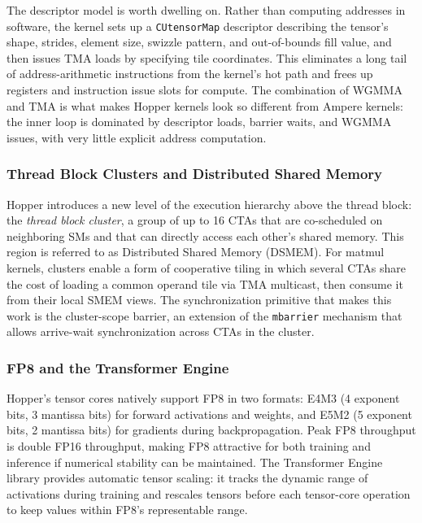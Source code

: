 \documentclass[10pt]{article}
\begin{document}
The descriptor model is worth dwelling on. Rather than computing addresses in software, the kernel sets up a \texttt{CUtensorMap} descriptor describing the tensor's shape, strides, element size, swizzle pattern, and out-of-bounds fill value, and then issues TMA loads by specifying tile coordinates. This eliminates a long tail of address-arithmetic instructions from the kernel's hot path and frees up registers and instruction issue slots for compute. The combination of WGMMA and TMA is what makes Hopper kernels look so different from Ampere kernels: the inner loop is dominated by descriptor loads, barrier waits, and WGMMA issues, with very little explicit address computation.

\subsubsection{Thread Block Clusters and Distributed Shared Memory}
Hopper introduces a new level of the execution hierarchy above the thread block: the \emph{thread block cluster}, a group of up to 16 CTAs that are co-scheduled on neighboring SMs and that can directly access each other's shared memory. This region is referred to as Distributed Shared Memory (DSMEM). For matmul kernels, clusters enable a form of cooperative tiling in which several CTAs share the cost of loading a common operand tile via TMA multicast, then consume it from their local SMEM views. The synchronization primitive that makes this work is the cluster-scope barrier, an extension of the \texttt{mbarrier} mechanism that allows arrive-wait synchronization across CTAs in the cluster.

\subsubsection{FP8 and the Transformer Engine}
Hopper's tensor cores natively support FP8 in two formats: E4M3 (4 exponent bits, 3 mantissa bits) for forward activations and weights, and E5M2 (5 exponent bits, 2 mantissa bits) for gradients during backpropagation. Peak FP8 throughput is double FP16 throughput, making FP8 attractive for both training and inference if numerical stability can be maintained. The Transformer Engine library \citep{nvidia2024transformerengine} provides automatic tensor scaling: it tracks the dynamic range of activations during training and rescales tensors before each tensor-core operation to keep values within FP8's representable range.
\end{document}
